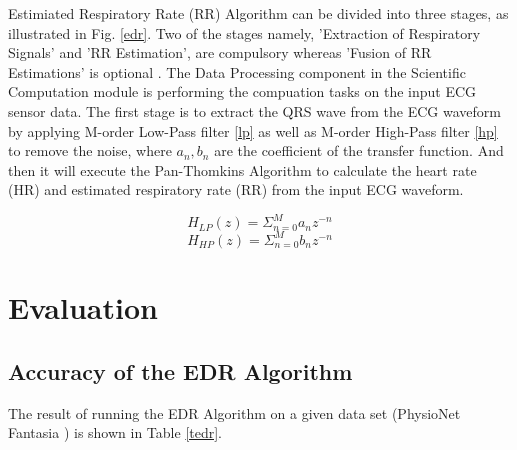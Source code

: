 \documentclass[conference]{IEEEtran}
\begin{document}
Estimiated Respiratory Rate (RR) Algorithm can be divided into three stages, as illustrated in Fig. \ref{edr}. Two of the stages namely, 'Extraction of Respiratory Signals' and 'RR Estimation', are compulsory whereas 'Fusion of RR Estimations' is optional \cite{b17}. The Data Processing component in the Scientific Computation module is performing the compuation tasks on the input ECG sensor data. The first stage is to extract the QRS wave from the ECG waveform by applying M-order Low-Pass filter \eqref{lp} as well as M-order High-Pass filter \eqref{hp} to remove the noise, where $a_n,b_n$ are the coefficient of the transfer function. And then it will execute the Pan-Thomkins Algorithm \cite{b21} to calculate the heart rate (HR) and estimated respiratory rate (RR) from the input ECG waveform.

\begin{equation}
H_{LP}(z)=\Sigma_{n=0}^Ma_nz^{-n} \label{lp}
\end{equation}
\begin{equation}
H_{HP}(z)=\Sigma_{n=0}^Mb_nz^{-n} \label{hp}
\end{equation}






\section{Evaluation}


\subsection{Accuracy of the EDR Algorithm}

The result of running the EDR Algorithm on a given data set (PhysioNet Fantasia \cite{b22}) is shown in Table \ref{tedr}.
\end{document}
